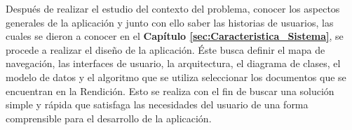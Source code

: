 Después de realizar el estudio del contexto del problema, conocer los aspectos generales de la aplicación y junto con ello saber las historias de usuarios, las cuales se dieron a conocer en el \textbf{Capítulo \ref{sec:Caracteristica_Sistema}}, se procede a realizar el diseño de la aplicación. Éste busca definir el mapa de navegación, las interfaces de usuario, la arquitectura, el diagrama de clases, el modelo de datos y el algoritmo que se utiliza seleccionar los documentos que se encuentran en la Rendición. Esto se realiza con el fin de buscar una solución simple y rápida que satisfaga las necesidades del usuario de una forma comprensible para el desarrollo de la aplicación.